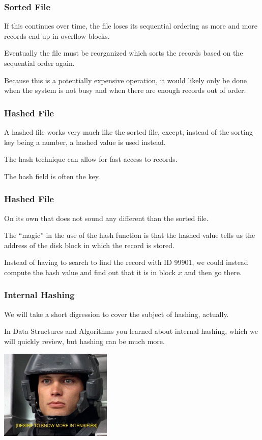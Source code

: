 \begin{frame}
\frametitle{Sorted File}

If this continues over time, the file loses its sequential ordering as more and more records end up in overflow blocks. 

Eventually the file must be reorganized which sorts the records based on the sequential order again. 

Because this is a potentially expensive operation, it would likely only be done when the system is not busy and when there are enough records out of order.

\end{frame}



\begin{frame}
\frametitle{Hashed File}

A hashed file works very much like the sorted file, except, instead of the sorting key being a number, a hashed value is used instead. 

The hash technique can allow for fast access to records. 

The hash field is often the key. 

\end{frame}

\begin{frame}
\frametitle{Hashed File}

On its own that does not sound any different than the sorted file. 

The ``magic'' in the use of the hash function is that the hashed value tells us the address of the disk block in which the record is stored. 

Instead of having to search to find the record with ID 99901, we could instead compute the hash value and find out that it is in block $x$ and then go there.

\end{frame}



\begin{frame}
\frametitle{Internal Hashing}

We will take a short digression to cover the subject of hashing, actually. 

In Data Structures and Algorithms you learned about \alert{internal hashing}, which we will quickly review, but hashing can be much more.

\begin{center}
	\includegraphics[width=0.4\textwidth]{images/knowmore.jpg}
\end{center}


\end{frame}


